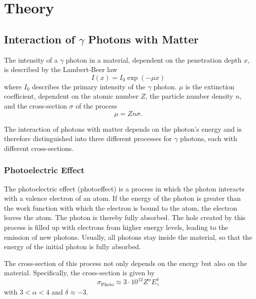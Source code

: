 \section{Theory}
\label{sec:theory}
\subsection{Interaction of \texorpdfstring{$\gamma$}{gamma} Photons with Matter}
\label{sec:process}

\noindent
The intensity of a $\gamma$ photon in a material, dependent on 
the penetration depth $x$, is described by the Lambert-Beer law
\begin{equation}
    I(x) = I_0 \exp{(-\mu x)}
\end{equation}
where $I_0$ describes the primary intensity of the $\gamma$ 
photon. $\mu$ is the extinction coefficient, dependent on the 
atomic number $Z$, the particle number density $n$, and the 
cross-section $\sigma$ of the process
\begin{equation}
    \mu = Z n \sigma.
\end{equation}

\noindent
The interaction of photons with matter depends on the photon's 
energy and is therefore distinguished into three different 
processes for $\gamma$ photons, each with different cross-sections.

\subsubsection*{Photoelectric Effect}
The photoelectric effect (photoeffect) is a process in which the 
photon interacts with a valence electron of an atom. If the energy 
of the photon is greater than the work function with which the 
electron is bound to the atom, the electron leaves the atom. The 
photon is thereby fully absorbed. The hole created by this process 
is filled up with electrons from higher energy levels, leading to 
the emission of new photons. Usually, all photons stay inside the 
material, so that the energy of the initial photon is fully absorbed.

\noindent
The cross-section of this process not only depends on the energy but 
also on the material. Specifically, the cross-section is given by
\begin{equation}
    \sigma_\text{Photo}\approx 3\cdot 10^{12} Z^\alpha E_\gamma^\delta
\end{equation}
with $3<\alpha<4$ and $\delta\approx -3$. 


